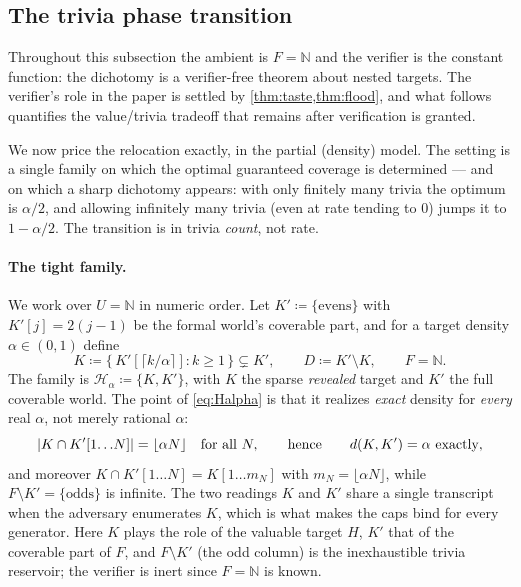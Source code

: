 \documentclass[11pt]{article}
\numberwithin{equation}{section}
\newcommand{\N}{\mathbb{N}}
\newcommand{\mc}[1]{\mathcal{#1}}
\newcommand{\defeq}{\coloneqq}
\DeclarePairedDelimiter{\abs}{\lvert}{\rvert}
\newcommand{\gnd}{U}
\newcommand{\Amb}{F}
\newcommand{\Val}{H}
\newcommand{\Hcal}{\mc{H}}
\newcommand{\Hfam}{\Hcal_{\alpha}}
\newcommand{\dens}[2]{d(#1,#2)}
\newcommand{\rest}[2]{#1[1\!\dots\! #2]}
\theoremstyle{plain}
\theoremstyle{definition}
\theoremstyle{remark}
\begin{document}
\subsection{The trivia phase transition}
\label{sec:res-dichotomy}

Throughout this subsection the ambient is $\Amb = \N$ and the verifier is the constant
function: the dichotomy is a verifier-free theorem about nested targets. The verifier's role
in the paper is settled by \cref{thm:taste,thm:flood}, and what follows quantifies the
value/trivia tradeoff that remains after verification is granted.

\begin{figure}[omitted: a diagram of this paper's results, not reproduced here]\label{fig:phase}\end{figure}


We now price the relocation exactly, in the partial (density) model. The setting is a single
family on which the optimal guaranteed coverage is determined --- and on which a sharp
dichotomy appears: with only finitely many trivia the optimum is $\alpha/2$, and allowing
infinitely many trivia (even at rate tending to $0$) jumps it to $1 - \alpha/2$. The
transition is in trivia \emph{count}, not rate.

\paragraph{The tight family.}
We work over $\gnd = \N$ in numeric order. Let $K' \defeq \{\text{evens}\}$ with $K'[j] =
2(j-1)$ be the formal world's coverable part, and for a target density $\alpha \in (0,1)$
define
\begin{equation}\label{eq:Halpha}
  K \defeq \{\, K'[\lceil k/\alpha \rceil] : k \ge 1 \,\}
  \subsetneq K' , \qquad
  D \defeq K' \setminus K , \qquad \Amb = \N .
\end{equation}
The family is $\Hfam \defeq \{K, K'\}$, with $K$ the sparse \emph{revealed} target and $K'$
the full coverable world. The point of \eqref{eq:Halpha} is that it realizes \emph{exact}
density for \emph{every} real $\alpha$, not merely rational $\alpha$:
\begin{equation}\label{eq:exactdensity}
  \abs{K \cap \rest{K'}{N}} = \lfloor \alpha N \rfloor
  \quad\text{for all } N, \qquad\text{hence}\qquad \dens{K}{K'} = \alpha \text{ exactly},
\end{equation}
and moreover $K \cap \rest{K'}{N} = \rest{K}{m_N}$ with $m_N = \lfloor \alpha N \rfloor$,
while $\Amb \setminus K' = \{\text{odds}\}$ is infinite. The two readings $K$ and $K'$ share a
single transcript when the adversary enumerates $K$, which is what makes the caps bind for
every generator. Here $K$ plays the role of the valuable target $\Val$, $K'$ that of the
coverable part of $\Amb$, and $\Amb \setminus K'$ (the odd column) is the inexhaustible trivia
reservoir; the verifier is inert since $\Amb = \N$ is known.
\end{document}
